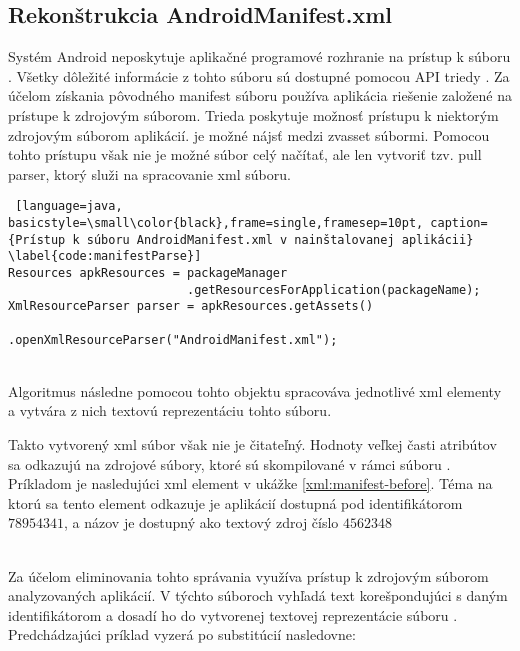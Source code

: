 \subsection{Rekonštrukcia AndroidManifest.xml}
Systém Android neposkytuje aplikačné programové rozhranie na prístup k súboru . Všetky dôležité informácie z tohto súboru sú dostupné pomocou API triedy . Za účelom získania pôvodného manifest súboru používa aplikácia  riešenie založené na prístupe k zdrojovým súborom. Trieda  poskytuje možnosť prístupu k niektorým zdrojovým súborom aplikácií.  je možné nájsť medzi 
zv{asset} súbormi. Pomocou tohto prístupu však nie je možné súbor celý načítať, ale len vytvoriť tzv. pull parser, ktorý služi na spracovanie xml súboru.\\ 
\begin{lstlisting} [language=java, basicstyle=\small\color{black},frame=single,framesep=10pt, caption= {Prístup k súboru AndroidManifest.xml v nainštalovanej aplikácii} \label{code:manifestParse}]
Resources apkResources = packageManager
                         .getResourcesForApplication(packageName);
XmlResourceParser parser = apkResources.getAssets()
                         .openXmlResourceParser("AndroidManifest.xml");
\end{lstlisting}
\mbox{}\\
\noindent Algoritmus následne pomocou tohto objektu spracováva jednotlivé xml elementy a vytvára z nich textovú reprezentáciu tohto súboru.


Takto vytvorený xml súbor však nie je čitateľný. Hodnoty veľkej časti atribútov sa odkazujú na zdrojové súbory, ktoré sú skompilované v rámci súboru . Príkladom je nasledujúci xml element v ukážke \ref{xml:manifest-before}.  Téma na ktorú sa tento element odkazuje je aplikácií dostupná pod identifikátorom $78954341$, a názov je dostupný ako textový zdroj číslo $4562348$ 

\mbox{}\\
Za účelom eliminovania tohto správania využíva  prístup k zdrojovým súborom analyzovaných aplikácií. V týchto súboroch vyhľadá text korešpondujúci s daným identifikátorom a dosadí ho do vytvorenej textovej reprezentácie súboru . Predchádzajúci príklad vyzerá po substitúcií nasledovne:

